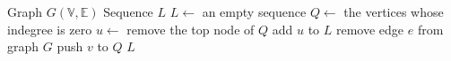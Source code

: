 \begin{algorithmic}[1]
    \REQUIRE Graph $G(\mathbb{V}, \mathbb{E})$
    \ENSURE Sequence $L$
    \STATE $L \leftarrow$ an empty sequence
    \STATE $Q \leftarrow$ the vertices whose indegree is zero
        \STATE $u \leftarrow$ remove the top node of $Q$
        \STATE add $u$ to $L$
            \STATE remove edge $e$ from graph $G$
                \STATE push $v$ to $Q$
            \ENDIF
        \ENDFOR
    \ENDWHILE
    \RETURN $L$
\end{algorithmic}